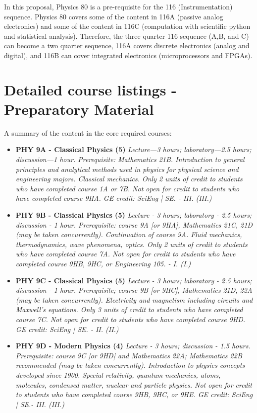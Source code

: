 \documentclass[12pt]{article}
\begin{document}
In this proposal, Physics 80 is a pre-requisite for the 116 (Instrumentation) sequence.  Physics 80 covers some of the content in 116A (passive analog electronics) and some of the content in 116C (computation with scientific python and statistical analysis).  Therefore, the three quarter 116 sequence (A,B, and C) can become a two quarter sequence, 116A covers discrete electronics (analog and digital), and 116B can cover integrated electronics (microprocessors and FPGAs).

\newpage
\section{Detailed course listings - Preparatory Material}

A summary of the content in the core required courses:
\begin{itemize}

\item {\bf PHY 9A - Classical Physics (5)}
{\it Lecture—3 hours; laboratory—2.5 hours; discussion—1 hour. Prerequisite: Mathematics 21B. Introduction to general principles and analytical methods used in physics for physical science and engineering majors. Classical mechanics. Only 2 units of credit to students who have completed course 1A or 7B. Not open for credit to students who have completed course 9HA. GE credit: SciEng | SE. - III. (III.)}

\item {\bf PHY 9B - Classical Physics (5)}
{\it Lecture - 3 hours; laboratory - 2.5 hours; discussion - 1 hour. Prerequisite: course 9A [or 9HA], Mathematics 21C, 21D (may be taken concurrently). Continuation of course 9A. Fluid mechanics, thermodynamics, wave phenomena, optics. Only 2 units of credit to students who have completed course 7A. Not open for credit to students who have completed course 9HB, 9HC, or Engineering 105. - I. (I.)}

\item {\bf PHY 9C - Classical Physics (5)}
{\it Lecture - 3 hours; laboratory - 2.5 hours; discussion - 1 hour. Prerequisite; course 9B [or 9HC], Mathematics 21D, 22A (may be taken concurrently). Electricity and magnetism including circuits and Maxwell’s equations. Only 3 units of credit to students who have completed course 7C. Not open for credit to students who have completed course 9HD. GE credit: SciEng | SE. - II. (II.)}

\item {\bf PHY 9D - Modern Physics (4)}
{\it Lecture - 3 hours; discussion - 1.5 hours. Prerequisite: course 9C [or 9HD] and Mathematics 22A; Mathematics 22B recommended (may be taken concurrently). Introduction to physics concepts developed since 1900. Special relativity, quantum mechanics, atoms, molecules, condensed matter, nuclear and particle physics. Not open for credit to students who have completed course 9HB, 9HC, or 9HE. GE credit: SciEng | SE.- III. (III.)}


\end{itemize}
\end{document}
